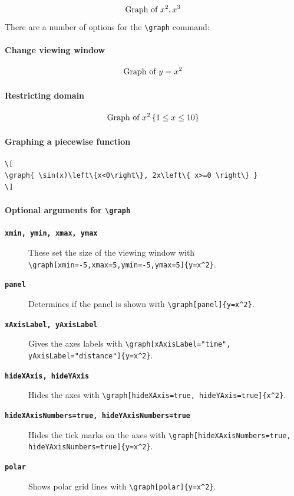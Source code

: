 \documentclass{ximera}
\begin{document}
\[
  \graph{x^2,x^3}
\]
There are a number of options for the \verb|\graph| command:



\paragraph{Change viewing window}
\[
  \graph[xmin=-5,xmax=5,ymin=-5,ymax=5]{y=x^2}
\]

\paragraph{Restricting domain}
\[
  \graph{x^2 \left\{ 1 \leq x \leq 10 \right\} }
\]
\paragraph{Graphing a piecewise function}

\begin{verbatim}
\[
\graph{ \sin(x)\left\{x<0\right\}, 2x\left\{ x>=0 \right\} }
\]
\end{verbatim}

\paragraph{Optional arguments for \texttt{\textbackslash graph}}

\begin{description}
  \item[\tt\bfseries xmin, ymin, xmax, ymax] These set the
    size of the viewing window with
    \verb|\graph[xmin=-5,xmax=5,ymin=-5,ymax=5]{y=x^2}|.
  \item[\tt\bfseries panel] Determines if the panel is shown with
    \verb|\graph[panel]{y=x^2}|.
  \item[\tt\bfseries xAxisLabel, yAxisLabel] Gives the axes labels with
    \verb|\graph[xAxisLabel="time", yAxisLabel="distance"]{y=x^2}|.
  \item[\tt\bfseries hideXAxis, hideYAxis] Hides the axes with
    \verb|\graph[hideXAxis=true, hideYAxis=true]{x^2}|.
  \item[\tt\bfseries hideXAxisNumbers=true, hideYAxisNumbers=true] Hides the tick marks on
    the axes with
    \verb|\graph[hideXAxisNumbers=true, hideYAxisNumbers=true]{y=x^2}|.
  \item[\tt\bfseries polar] Shows polar grid lines with \verb|\graph[polar]{y=x^2}|.
\end{description}
\end{document}
